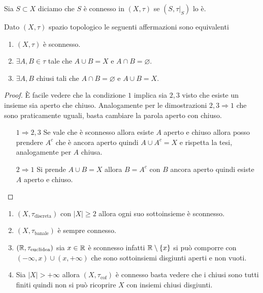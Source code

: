 \begin{definition}
	Sia $S \subset X$ diciamo che $S$ è connesso in $(X, \tau)$ se $(S, \tau|_S)$ lo è. 
\end{definition} 

\begin{theorem}
	Dato $(X, \tau)$ spazio topologico le seguenti affermazioni sono equivalenti 
	\begin{enumerate}
		\item $(X, \tau)$ è sconnesso. 
		\item $\exists A, B \in \tau$ tale che $A \cup B = X$ e $A \cap B = \varnothing$.
		\item $\exists A, B$ chiusi tali che $A\cap B = \varnothing$ e $A \cup B = X$.
	\end{enumerate}
\end{theorem} 
\begin{proof}
	È facile vedere che la condizione $1$ implica sia $2,3$ visto che esiste un insieme sia aperto che chiuso. Analogamente per le dimostrazioni $2,3 \Rightarrow 1$ che sono praticamente uguali, basta cambiare la parola aperto con chiuso. 
	\begin{enumerate}
		\item[$1\Rightarrow 2,3$] Se vale che è sconnesso allora esiste $A$ aperto e chiuso allora posso prendere $A^c$ che è ancora aperto quindi $A\cup A^c = X$ e rispetta la tesi, analogamente per $A$ chiusa. 
		\item[$2 \Rightarrow 1$] Si prende $A \cup B = X$ allora $B = A^c$ con $B$ ancora aperto quindi esiste $A$ aperto e chiuso. 
	\end{enumerate}
\end{proof}

\begin{example}
\begin{enumerate}
	\item $(X, \tau_{\text{discreta}})$ con $|X| \ge 2$ allora ogni suo sottoinsieme è sconnesso. 
	\item $(X, \tau_{\text{banale}})$ è sempre connesso. 
	\item $(\mathbb{R}, \tau_{\text{euclidea}})$ sia $x \in \mathbb{R}$ è sconnesso infatti $\mathbb{R} \setminus \left\{x\right\}$ si può comporre con $(-\infty, x) \cup (x, +\infty)$ che sono sottoinsiemi disgiunti aperti e non vuoti. 
	\item Sia $|X| > + \infty$ allora $(X, \tau_{\text{cof}})$ è connesso basta vedere che i chiusi sono tutti finiti quindi non si può ricoprire $X$ con insiemi chiusi disgiunti. 
\end{enumerate}
\end{example}

